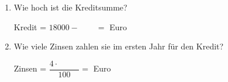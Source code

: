 \begin{enumerate}[label=\arabic*., resume]
\begin{enumerate}[label=\alph*)]
        \vspace{0.5cm}

        \item Wie hoch ist die Kreditsumme?

        \vspace{0.3cm}
        Kredit = $18000 - \phantom{0000} = $ \underline{\hspace{3cm}} Euro

        \vspace{0.5cm}

        \item Wie viele Zinsen zahlen sie im ersten Jahr für den Kredit?

        \vspace{0.3cm}
        Zinsen = $\dfrac{4 \cdot \phantom{00000}}{100} = $ \underline{\hspace{3cm}} Euro

    \end{enumerate}

\end{enumerate}